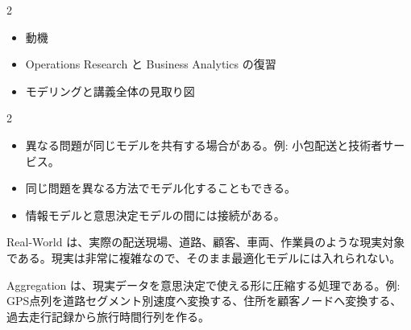 \clearpage
{}
\begin{multicols}{2}\scriptsize\raggedcolumns
{}
\begin{itemize}
\item 動機
\item Operations Research と Business Analytics の復習
\item モデリングと講義全体の見取り図
\end{itemize}
\end{multicols}

\clearpage
{}
\begin{multicols}{2}\footnotesize\raggedcolumns
{}
\begin{itemize}
\item 異なる問題が同じモデルを共有する場合がある。例: 小包配送と技術者サービス。
\item 同じ問題を異なる方法でモデル化することもできる。
\item 情報モデルと意思決定モデルの間には接続がある。
\end{itemize}
Real-World は、実際の配送現場、道路、顧客、車両、作業員のような現実対象である。現実は非常に複雑なので、そのまま最適化モデルには入れられない。\par

Aggregation は、現実データを意思決定で使える形に圧縮する処理である。例: GPS点列を道路セグメント別速度へ変換する、住所を顧客ノードへ変換する、過去走行記録から旅行時間行列を作る。\par


\end{multicols}
